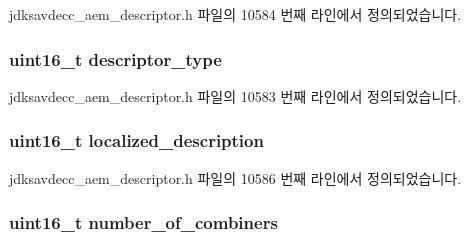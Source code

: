 jdksavdecc\+\_\+aem\+\_\+descriptor.\+h 파일의 10584 번째 라인에서 정의되었습니다.

\subsubsection[{\texorpdfstring{descriptor\+\_\+type}{descriptor_type}}]{\setlength{\rightskip}{0pt plus 5cm}uint16\+\_\+t descriptor\+\_\+type}\hypertarget{structjdksavdecc__descriptor__sensor__unit_ab7c32b6c7131c13d4ea3b7ee2f09b78d}{}\label{structjdksavdecc__descriptor__sensor__unit_ab7c32b6c7131c13d4ea3b7ee2f09b78d}


jdksavdecc\+\_\+aem\+\_\+descriptor.\+h 파일의 10583 번째 라인에서 정의되었습니다.

\subsubsection[{\texorpdfstring{localized\+\_\+description}{localized_description}}]{\setlength{\rightskip}{0pt plus 5cm}uint16\+\_\+t localized\+\_\+description}\hypertarget{structjdksavdecc__descriptor__sensor__unit_a0926f846ca65a83ad5bb06b4aff8f408}{}\label{structjdksavdecc__descriptor__sensor__unit_a0926f846ca65a83ad5bb06b4aff8f408}


jdksavdecc\+\_\+aem\+\_\+descriptor.\+h 파일의 10586 번째 라인에서 정의되었습니다.

\subsubsection[{\texorpdfstring{number\+\_\+of\+\_\+combiners}{number_of_combiners}}]{\setlength{\rightskip}{0pt plus 5cm}uint16\+\_\+t number\+\_\+of\+\_\+combiners}\hypertarget{structjdksavdecc__descriptor__sensor__unit_afbc32f9432e80e58a019b1be2388cf66}{}\label{structjdksavdecc__descriptor__sensor__unit_afbc32f9432e80e58a019b1be2388cf66}



